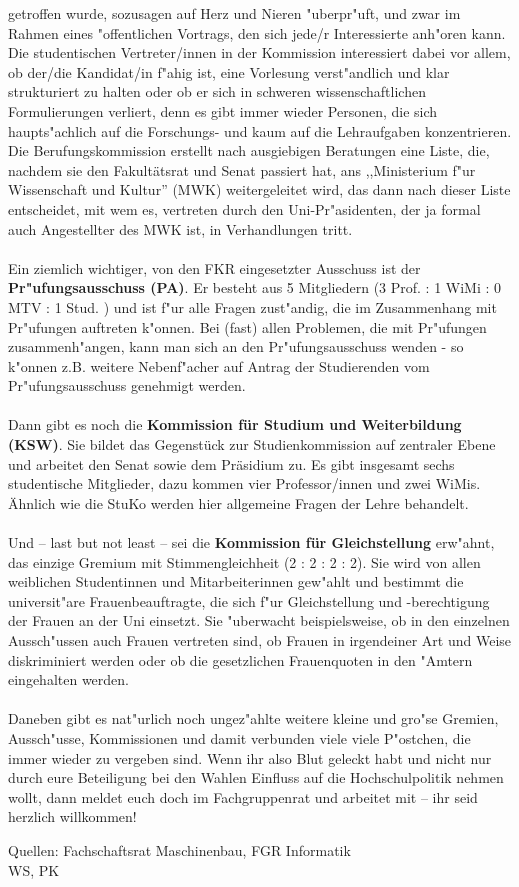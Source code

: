 getroffen wurde, sozusagen auf Herz und Nieren "uberpr"uft, und zwar im Rahmen 
eines "offentlichen Vortrags, den sich jede/r Interessierte anh"oren kann. Die 
 studentischen Vertreter/innen in der Kommission interessiert dabei vor allem, ob 
der/die Kandidat/in f"ahig ist, eine Vorlesung verst"andlich und klar 
strukturiert zu halten oder ob er sich in schweren wissenschaftlichen 
Formulierungen verliert, denn es gibt immer wieder Personen, die sich
haupts"achlich auf die Forschungs- und kaum auf die Lehraufgaben konzentrieren.
Die Berufungskommission 
erstellt nach ausgiebigen Beratungen eine Liste, die, nachdem sie den Fakultätsrat und Senat 
passiert hat, ans ,,Ministerium f"ur 
Wissenschaft und Kultur'' (MWK) weitergeleitet wird, das dann nach dieser 
Liste entscheidet, mit wem es, vertreten durch den Uni-Pr"asidenten, der ja 
formal auch Angestellter des MWK ist, in Verhandlungen tritt.
\\
\\
Ein ziemlich wichtiger, von den FKR eingesetzter Ausschuss ist der 
\textbf{Pr"ufungsausschuss (PA)}. Er besteht aus 5 Mitgliedern (3 Prof. : 1 WiMi : 0 MTV : 
1 Stud. ) und ist f"ur alle Fragen zust"andig, die im Zusammenhang mit Pr"ufungen
auftreten k"onnen. Bei (fast) allen Problemen, die mit Pr"ufungen 
zusammenh"angen, kann
man sich an den Pr"ufungsausschuss wenden - so k"onnen z.B. weitere
Nebenf"acher auf Antrag der Studierenden vom Pr"ufungsausschuss genehmigt
werden.
\\
\\
Dann gibt es noch die \textbf{Kommission für Studium und Weiterbildung (KSW)}. 
Sie bildet das Gegenstück zur Studienkommission auf zentraler Ebene und arbeitet den Senat sowie dem 
Präsidium zu. Es gibt insgesamt sechs studentische Mitglieder, dazu kommen vier Professor/innen und zwei WiMis. 
Ähnlich wie die StuKo werden hier allgemeine Fragen der Lehre behandelt.
\\
\\
Und -- last but not least -- sei die \textbf{Kommission für Gleichstellung} 
erw"ahnt, das einzige Gremium mit Stimmengleichheit (2 : 2 : 2 : 2). Sie wird von allen 
weiblichen Studentinnen und Mitarbeiterinnen gew"ahlt und bestimmt 
 die universit"are Frauenbeauftragte, die sich f"ur Gleichstellung und 
-berechtigung der Frauen an der Uni einsetzt. Sie "uberwacht beispielsweise, ob 
in den einzelnen Aussch"ussen auch Frauen vertreten sind, ob Frauen in 
irgendeiner Art und Weise diskriminiert werden oder ob die gesetzlichen 
Frauenquoten in den "Amtern eingehalten werden. 
\\
\\
Daneben gibt es nat"urlich noch ungez"ahlte weitere kleine und gro"se Gremien, 
Aussch"usse, Kommissionen und damit verbunden viele viele P"ostchen, die immer 
wieder zu vergeben sind. Wenn ihr also Blut geleckt habt und nicht nur durch 
eure Beteiligung bei den Wahlen Einfluss auf die Hochschulpolitik nehmen wollt, 
dann meldet euch doch im Fachgruppenrat und arbeitet mit -- ihr seid herzlich 
willkommen!

{Quellen: Fachschaftsrat Maschinenbau, FGR Informatik\\WS, PK}
